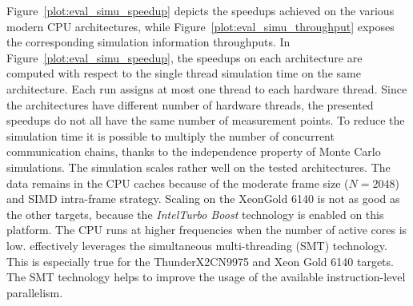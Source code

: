 Figure~\ref{plot:eval_simu_speedup} depicts the speedups achieved on the various
modern CPU architectures, while Figure~\ref{plot:eval_simu_throughput} exposes
the corresponding simulation information throughputs. In
Figure~\ref{plot:eval_simu_speedup}, the speedups on each architecture are computed
with respect to the single thread simulation time on the same architecture. Each
run assigns at most one \AFFECT thread to each hardware thread. Since the
architectures have different number of hardware threads, the presented speedups
do not all have the same number of measurement points.
To reduce the simulation time it is possible to multiply the number of
concurrent communication chains, thanks to the independence property of Monte
Carlo simulations.
The simulation scales rather well on the tested architectures. The data remains
in the CPU caches because of the moderate frame size ($N = 2048$) and SIMD
intra-frame strategy. Scaling on the Xeon\TM Gold 6140 is not as good as the
other targets, because the \textit{Intel\R Turbo Boost} technology is enabled on
this platform. The CPU runs at higher frequencies when the number of active
cores is low. \AFFECT effectively leverages the simultaneous multi-threading
(SMT) technology. This is especially true for the ThunderX2\R CN9975 and Xeon\TM
Gold 6140 targets. The SMT technology helps to improve the usage of the
available instruction-level parallelism.

